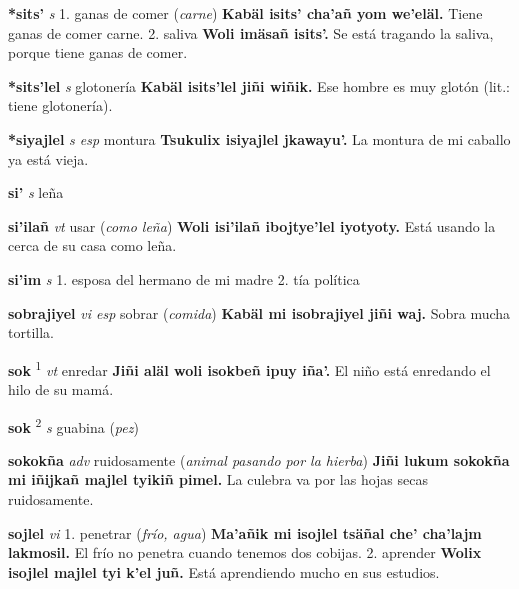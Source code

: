 \documentclass[10pt]{scrbook}
\newcommand{\entry}[1]{\textbf{#1}}
\newcommand{\onedefinition}[1]{#1.}
\newcommand{\defsuperscript}[1]{\textsuperscript{#1}}
\newcommand{\partofspeech}[1]{\textit{#1}}
\newcommand{\spanishtranslation}[1]{#1}
\newcommand{\clarification}[1]{(\textit{#1})}
\newcommand{\cholexample}[1]{\textbf{#1}}
\newcommand{\exampletranslation}[1]{#1}
\begin{document}
\begin{multicols}{2}
\entry{*sits'}
\partofspeech{s}
\onedefinition{1}
\spanishtranslation{ganas de comer}
\clarification{carne}
\cholexample{Kabäl isits' cha'añ yom we'eläl.}
\exampletranslation{Tiene ganas de comer carne.}
\onedefinition{2}
\spanishtranslation{saliva}
\cholexample{Woli imäsañ isits'.}
\exampletranslation{Se está tragando la saliva, porque tiene ganas de comer.}

\entry{*sits'lel}
\partofspeech{s}
\spanishtranslation{glotonería}
\cholexample{Kabäl isits'lel jiñi wiñik.}
\exampletranslation{Ese hombre es muy glotón (lit.: tiene glotonería).}

\entry{*siyajlel}
\partofspeech{s esp}
\spanishtranslation{montura}
\cholexample{Tsukulix isiyajlel jkawayu'.}
\exampletranslation{La montura de mi caballo ya está vieja.}

\entry{si'}
\partofspeech{s}
\spanishtranslation{leña}

\entry{si'ilañ}
\partofspeech{vt}
\spanishtranslation{usar}
\clarification{como leña}
\cholexample{Woli isi'ilañ ibojtye'lel iyotyoty.}
\exampletranslation{Está usando la cerca de su casa como leña.}

\entry{si'im}
\partofspeech{s}
\onedefinition{1}
\spanishtranslation{esposa del hermano de mi madre}
\onedefinition{2}
\spanishtranslation{tía política}

\entry{sobrajiyel}
\partofspeech{vi esp}
\spanishtranslation{sobrar}
\clarification{comida}
\cholexample{Kabäl mi isobrajiyel jiñi waj.}
\exampletranslation{Sobra mucha tortilla.}

\entry{sok}
\defsuperscript{1}
\partofspeech{vt}
\spanishtranslation{enredar}
\cholexample{Jiñi aläl woli isokbeñ ipuy iña'.}
\exampletranslation{El niño está enredando el hilo de su mamá.}

\entry{sok}
\defsuperscript{2}
\partofspeech{s}
\spanishtranslation{guabina}
\clarification{pez}

\entry{sokokña}
\partofspeech{adv}
\spanishtranslation{ruidosamente}
\clarification{animal pasando por la hierba}
\cholexample{Jiñi lukum sokokña mi iñijkañ majlel tyikiñ pimel.}
\exampletranslation{La culebra va por las hojas secas ruidosamente.}

\entry{sojlel}
\partofspeech{vi}
\onedefinition{1}
\spanishtranslation{penetrar}
\clarification{frío, agua}
\cholexample{Ma'añik mi isojlel tsäñal che' cha'lajm lakmosil.}
\exampletranslation{El frío no penetra cuando tenemos dos cobijas.}
\onedefinition{2}
\spanishtranslation{aprender}
\cholexample{Wolix isojlel majlel tyi k'el juñ.}
\exampletranslation{Está aprendiendo mucho en sus estudios.}


\end{multicols}
\end{document}
